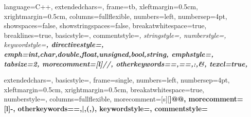 

\renewcommand\lstlistlistingname{\cyr\CYRL\cyri\cyrs\cyrt\cyri\cyrn\cyrg\cyri}


\lstset
{
		language=C++,
		extendedchars=\true, %
		frame=tb, %
		xleftmargin=0.5cm,
		xrightmargin=0.5cm,
		columns=fullflexible,
		numbers=left,                    %
		numbersep=4pt,                   %
		showspaces=false,
		showstringspaces=false,
		breakatwhitespace=true,         %
		breaklines=true,                 %
		basicstyle=\color{black}\small\sffamily,%
		commentstyle=\color{gray}\itshape, %
		stringstyle=\color{orange},
		numberstyle=\footnotesize\color{gray},
		keywordstyle=\color{black}\bfseries,
		directivestyle=\color{red},
		emph={int,char,double,float,unsigned,bool,string},
		emphstyle={\color{blue}\bfseries},
		tabsize=2,
		morecomment=[l]{//},
		otherkeywords={=,==,:,&},
		texcl=true,
}

{
		extendedchars=\true,
    basicstyle=\sffamily\scriptsize,
		frame=single,
		numbers=left, %
    numbersep=4pt, %
		xleftmargin=0.5cm,
		xrightmargin=0.5cm,
		breakatwhitespace=true,         %
    numberstyle=\small\color{gray}, %
    columns=fullflexible,
    morecomment=[s][\color{blue}\bfseries]{@}{@},
    morecomment=[l]{-},
    otherkeywords={=,|,(,)},
    keywordstyle={\color{brown}\bfseries},
    commentstyle=\color{gray}\itshape
}

